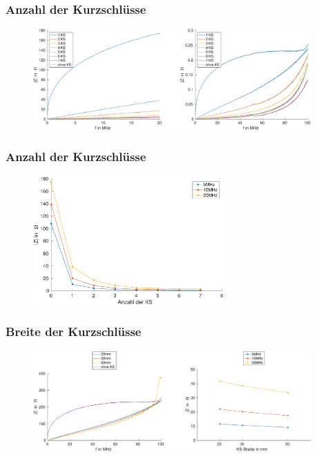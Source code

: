 \documentclass[accentcolor=tud9b, colorbacktitle, inverttitle]{tudbeamer}
\begin{document}
\begin{frame}\frametitle{Anzahl der Kurzschl\"usse}
\vspace{-1em}
\begin{figure}[h]
	\centering
	\includegraphics[width=0.95\textwidth]{impedance_numberKS_ringcore}
\end{figure}
\end{frame}


\begin{frame}\frametitle{Anzahl der Kurzschl\"usse}
 \vspace{-1em}
\begin{figure}[h]
	\centering
	\includegraphics[width=0.65\textwidth]{RK_Impedanz_numberKS_frequenz}
\end{figure}
\end{frame}



\begin{frame}\frametitle{Breite der Kurzschlüsse}
\vspace{-1em}
\begin{figure}[h]
	\centering
	\includegraphics[width=0.95\textwidth]{Z_ges_width_frequency_SimMeas}
\end{figure}
\end{frame}
\end{document}
